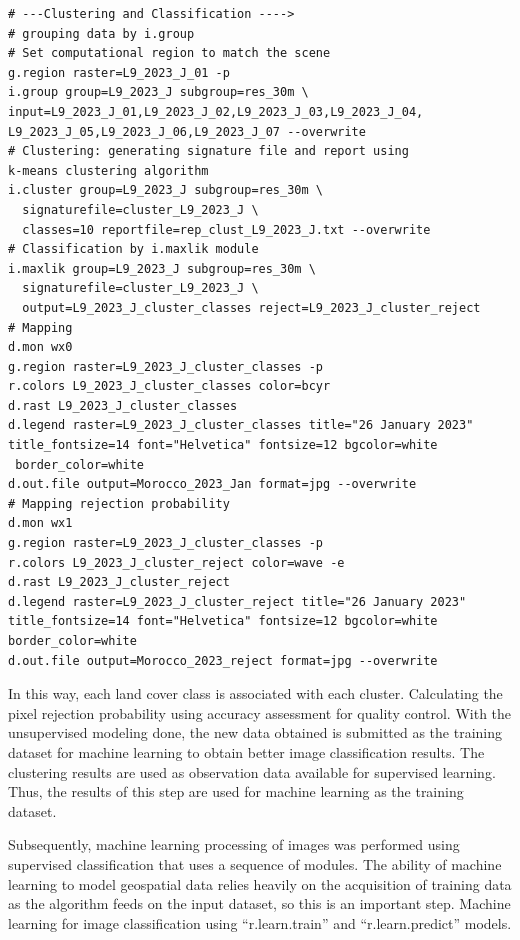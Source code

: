 \documentclass[geomatics,article,submit,pdftex,moreauthors]{Definitions/mdpi}
\begin{document}
\begin{footnotesize}
\begin{verbatim}
# ---Clustering and Classification ---->
# grouping data by i.group
# Set computational region to match the scene
g.region raster=L9_2023_J_01 -p
i.group group=L9_2023_J subgroup=res_30m \
input=L9_2023_J_01,L9_2023_J_02,L9_2023_J_03,L9_2023_J_04,
L9_2023_J_05,L9_2023_J_06,L9_2023_J_07 --overwrite
# Clustering: generating signature file and report using 
k-means clustering algorithm
i.cluster group=L9_2023_J subgroup=res_30m \
  signaturefile=cluster_L9_2023_J \
  classes=10 reportfile=rep_clust_L9_2023_J.txt --overwrite
# Classification by i.maxlik module
i.maxlik group=L9_2023_J subgroup=res_30m \
  signaturefile=cluster_L9_2023_J \
  output=L9_2023_J_cluster_classes reject=L9_2023_J_cluster_reject 
# Mapping
d.mon wx0
g.region raster=L9_2023_J_cluster_classes -p
r.colors L9_2023_J_cluster_classes color=bcyr
d.rast L9_2023_J_cluster_classes
d.legend raster=L9_2023_J_cluster_classes title="26 January 2023" 
title_fontsize=14 font="Helvetica" fontsize=12 bgcolor=white
 border_color=white
d.out.file output=Morocco_2023_Jan format=jpg --overwrite
# Mapping rejection probability
d.mon wx1
g.region raster=L9_2023_J_cluster_classes -p
r.colors L9_2023_J_cluster_reject color=wave -e
d.rast L9_2023_J_cluster_reject
d.legend raster=L9_2023_J_cluster_reject title="26 January 2023" 
title_fontsize=14 font="Helvetica" fontsize=12 bgcolor=white 
border_color=white
d.out.file output=Morocco_2023_reject format=jpg --overwrite
\end{verbatim}
\end{footnotesize}

In this way, each land cover class is associated with each cluster. Calculating the pixel rejection probability using accuracy assessment for quality control. With the unsupervised modeling done, the new data obtained is submitted as the training dataset for machine learning to obtain better image classification results. The clustering results are used as observation data available for supervised learning. Thus, the results of this step are used for machine learning as the training dataset.

Subsequently, machine learning processing of images was performed using supervised classification that uses a sequence of modules. The ability of machine learning to model geospatial data relies heavily on the acquisition of training data as the algorithm feeds on the input dataset, so this is an important step. Machine learning for image classification using “r.learn.train” and “r.learn.predict” models.
\end{document}
